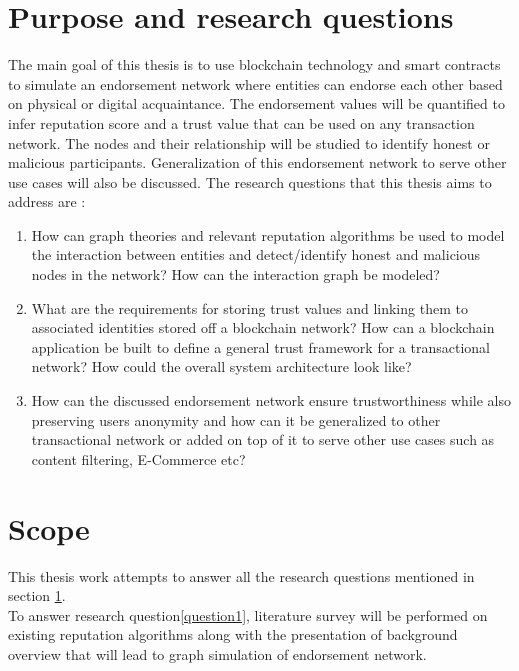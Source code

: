 \section{Purpose and research questions} \label{ResearchQuestions}
The main goal of this thesis is to use blockchain technology and 
smart contracts to simulate an endorsement network where entities can 
endorse each other based on physical or digital acquaintance. The 
endorsement values will be quantified to infer reputation score and 
a trust value that can be used on any transaction network. The nodes and 
their relationship will be studied to identify honest or malicious 
participants. Generalization of this endorsement network to serve 
other use cases will also be discussed. 
The research questions that this thesis aims to address are : 
\begin{enumerate}
\item How can graph theories and relevant reputation algorithms be used 
to model the interaction between entities and detect/identify honest 
and malicious nodes in the network? How can the interaction graph be
modeled? \label{question1}
\item What are the requirements for storing trust values and linking 
them to associated identities stored off a blockchain network? How can a blockchain application be built to define a general trust framework for 
a transactional network? How could the overall system architecture look like? \label{question2} 
\item How can the discussed endorsement network ensure trustworthiness
while also preserving users anonymity and how can it be generalized to
other transactional network or added on top of it to serve other use 
cases such as content filtering, E-Commerce etc?\label{question3} 
\end{enumerate}


\section{Scope} 
This thesis work attempts to answer all the research questions mentioned
in section \ref{ResearchQuestions}. \\

To answer research question\ref{question1}, literature survey will be performed on
existing reputation algorithms along with the presentation of background
overview that will lead to graph simulation of endorsement network. \\ 

